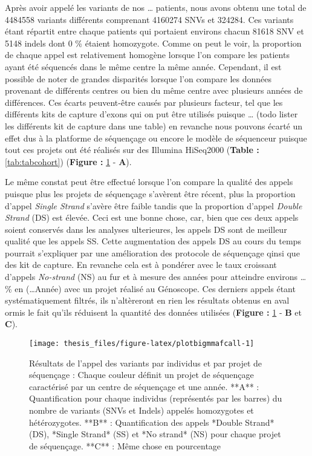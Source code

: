 \documentclass[12pt,twoside]{reedthesis}
\theoremstyle{definition}
\theoremstyle{definition}
\theoremstyle{remark}
\begin{document}
  Après avoir appelé les variants de nos \ldots{} patients, nous avons
  obtenu une total de 4484558 variants différents comprenant 4160274 SNVs
  et 324284. Ces variants étant répartit entre chaque patients qui
  portaient environs chacun 81618 SNV et 5148 indels dont 0 \% étaient
  homozygote. Comme on peut le voir, la proportion de chaque appel est
  relativement homogène lorsque l'on compare les patients ayant été
  séquencés dans le même centre la même année. Cependant, il est possible
  de noter de grandes disparités lorsque l'on compare les données
  provenant de différents centres ou bien du même centre avec plusieurs
  années de différences. Ces écarts peuvent-être causés par plusieurs
  facteur, tel que les différents kits de capture d'exons qui on put être
  utilisés puisque \ldots{} (todo lister les différents kit de capture
  dans une table) en revanche nous pouvons écarté un effet dus à la
  platforme de séquençage ou encore le modèle de séquenceur puisque tout
  ces projets ont été réalisés sur des Illumina HiSeq2000 (\textbf{Table :
  }\ref{tab:tabcohort}) (\textbf{Figure : }\ref{fig:plotbigmmafcall} -
  \textbf{A}).
  
  Le même constat peut être effectué lorsque l'on compare la qualité des
  appels puisque plus les projets de séquençage s'avèrent être récent,
  plus la proportion d'appel \emph{Single Strand} s'avère être faible
  tandis que la proportion d'appel \emph{Double Strand} (DS) est élevée.
  Ceci est une bonne chose, car, bien que ces deux appels soient conservés
  dans les analyses ulterieures, les appels DS sont de meilleur qualité
  que les appels SS. Cette augmentation des appels DS au cours du temps
  pourrait s'expliquer par une amélioration des protocole de séquençage
  qinsi que des kit de capture. En revanche cela est à pondérer avec le
  taux croissant d'appels \emph{No-strand} (NS) au fur et à mesure des
  années pour atteindre environs \ldots{} \% en (\ldots{}Année) avec un
  projet réalisé au Génoscope. Ces derniers appels étant systématiquement
  filtrés, ils n'altèreront en rien les résultats obtenus en aval ormis le
  fait qu'ils réduisent la quantité des données utilisées (\textbf{Figure
  : }\ref{fig:plotbigmmafcall} - \textbf{B} et \textbf{C}).
  
  \newpage
  
  \begin{figure}
  
  {\centering \texttt{[image: thesis\_files/figure-latex/plotbigmmafcall-1]} 
  
  }
  
  \caption[Résultats de l'appel des variants par individus et par projet de séquençage]{Résultats de l'appel des variants par individus et par projet de séquençage : Chaque couleur définit un projet de séquençage caractérisé par un centre de séquençage et une année. **A** : Quantification pour chaque individus (représentés par les barres) du nombre de variants (SNVs et Indels) appelés homozygotes et hétérozygotes. **B** : Quantification des appels *Double Strand* (DS), *Single Strand* (SS) et *No strand* (NS) pour chaque projet de séquençage. **C** : Même chose en pourcentage}\label{fig:plotbigmmafcall}
  \end{figure}
  
\end{document}
